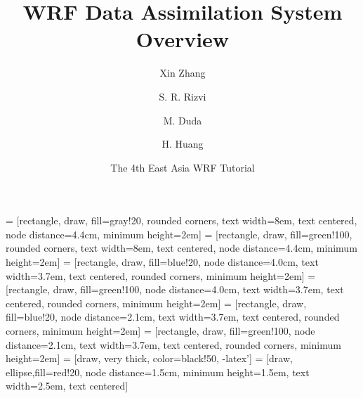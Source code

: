 \documentclass{beamer}
\begin{document}
\title[WRFDA System]{WRF Data Assimilation System Overview}

\author[Xin Zhang et al.]{Xin Zhang \and S. R. Rizvi \and M. Duda \and H. Huang}
\date{The 4th East Asia WRF Tutorial}

 = [rectangle, draw, fill=gray!20, rounded corners,
    text width=8em, text centered, node distance=4.4cm, minimum height=2em]
 = [rectangle, draw, fill=green!100, rounded corners,
    text width=8em, text centered, node distance=4.4cm, minimum height=2em]
 = [rectangle, draw, fill=blue!20, node distance=4.0cm, 
    text width=3.7em, text centered, rounded corners, minimum height=2em]
 = [rectangle, draw, fill=green!100, node distance=4.0cm, 
    text width=3.7em, text centered, rounded corners, minimum height=2em]
 = [rectangle, draw, fill=blue!20, node distance=2.1cm, 
    text width=3.7em, text centered, rounded corners, minimum height=2em]
 = [rectangle, draw, fill=green!100, node distance=2.1cm, 
    text width=3.7em, text centered, rounded corners, minimum height=2em]
 = [draw, very thick, color=black!50, -latex']
 = [draw, ellipse,fill=red!20, node distance=1.5cm,
    minimum height=1.5em, text width=2.5em, text centered]
\end{document}
